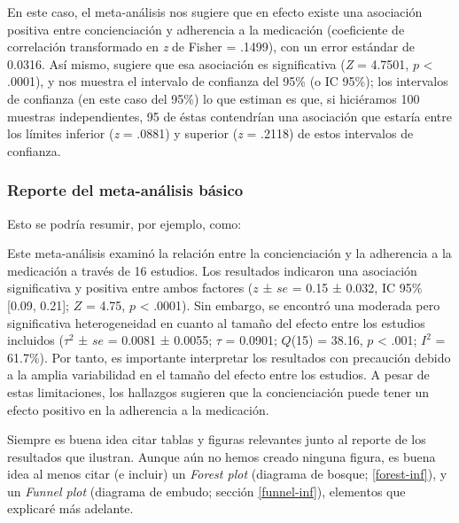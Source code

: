 \documentclass[
  bookmarksnumbered]{article}
\begin{document}
En este caso, el meta-análisis nos sugiere que en efecto existe una asociación positiva entre concienciación y adherencia a la medicación (coeficiente de correlación transformado en \emph{z} de Fisher = .1499), con un error estándar de 0.0316. Así mismo, sugiere que esa asociación es significativa (\emph{Z} = 4.7501, \(p\) \textless{} .0001), y nos muestra el intervalo de confianza del 95\% (o IC 95\%); los intervalos de confianza (en este caso del 95\%) lo que estiman es que, si hiciéramos 100 muestras independientes, 95 de éstas contendrían una asociación que estaría entre los límites inferior (\emph{z} = .0881) y superior (\emph{z} = .2118) de estos intervalos de confianza.

\hypertarget{reporte1}{%
\subsubsection{Reporte del meta-análisis básico}\label{reporte1}}

Esto se podría resumir, por ejemplo, como:

\begin{tcolorbox}[enhanced,attach boxed title to top center={yshift=-3mm,yshifttext=-1mm},
  colback=iacol!5!white,colframe=iacol!75!white,colbacktitle=iacol,
  title=Ejemplo de reporte básico,fonttitle=\bfseries,
  boxed title style={size=small,colframe=iacol} ]
  
Este meta-análisis examinó la relación entre la concienciación y la adherencia a la medicación a través de 16 estudios. Los resultados indicaron una asociación significativa y positiva entre ambos factores ($z$ ± $se$ = 0.15 ± 0.032, IC 95\% [0.09, 0.21]; $Z$ = 4.75, $p$ < .0001). Sin embargo, se encontró una moderada pero significativa heterogeneidad en cuanto al tamaño del efecto entre los estudios incluidos ($\tau^2$ ± $se$ =  0.0081 ± 0.0055; $\tau$ = 0.0901; $Q$(15) =  38.16, $p$ < .001; $I^2$ = 61.7\%). Por tanto, es importante interpretar los resultados con precaución debido a la amplia variabilidad en el tamaño del efecto entre los estudios. A pesar de estas limitaciones, los hallazgos sugieren que la concienciación puede tener un efecto positivo en la adherencia a la medicación.

\end{tcolorbox}

Siempre es buena idea citar tablas y figuras relevantes junto al reporte de los resultados que ilustran. Aunque aún no hemos creado ninguna figura, es buena idea al menos citar (e incluir) un \emph{Forest plot} (diagrama de bosque; \ref{forest-inf}), y un \emph{Funnel plot} (diagrama de embudo; sección \ref{funnel-inf}), elementos que explicaré más adelante.
\end{document}
